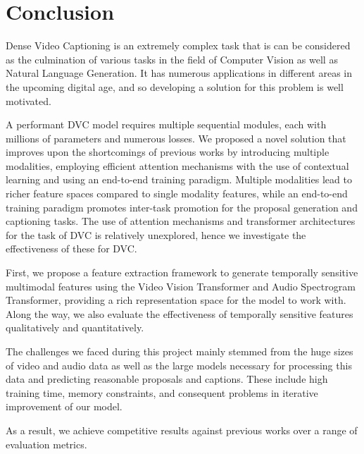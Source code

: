 \section{Conclusion}

\par Dense Video Captioning is an extremely complex task that is can be considered as the culmination of various tasks in the field of Computer Vision as well as Natural Language Generation. It has numerous applications in different areas in the upcoming digital age, and so developing a solution for this problem is well motivated.

\par A performant DVC model requires multiple sequential modules, each with millions of parameters and numerous losses. We proposed a novel solution that improves upon the shortcomings of previous works by introducing multiple modalities, employing efficient attention mechanisms with the use of contextual learning and using an end-to-end training paradigm. Multiple modalities lead to richer feature spaces compared to single modality features, while an end-to-end training paradigm promotes inter-task promotion for the proposal generation and captioning tasks. The use of attention mechanisms and transformer architectures for the task of DVC is relatively unexplored, hence we investigate the effectiveness of these for DVC.

\par First, we propose a feature extraction framework to generate temporally sensitive multimodal features using the Video Vision Transformer and Audio Spectrogram Transformer, providing a rich representation space for the model to work with. Along the way, we also evaluate the effectiveness of temporally sensitive features qualitatively and quantitatively.


\par The challenges we faced during this project mainly stemmed from the huge sizes of video and audio data as well as the large models necessary for processing this data and predicting reasonable proposals and captions. These include high training time, memory constraints, and consequent problems in iterative improvement of our model. 	

\par As a result, we achieve competitive results against previous works over a range of evaluation metrics.
